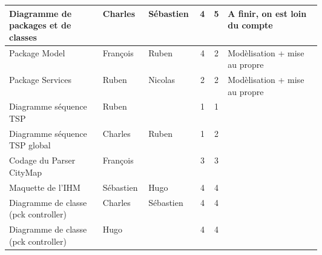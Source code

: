\begin{longtable}{|p{0.3\linewidth}|l|l|c|c|p{0.3\linewidth}|}
Diagramme de packages et de classes         & Charles                                        & Sébastien                                 & 4                             & 5                            & A finir, on est loin du compte                              \\ \hline
Package Model                               & François                                       & Ruben                                     & 4                             & 2                            & Modèlisation + mise au propre                               \\ \hline
Package Services                            & Ruben                                          & Nicolas                                   & 2                             & 2                            & Modèlisation + mise au propre                               \\ \hline
Diagramme séquence TSP                      & Ruben                                          &                                           & 1                             & 1                            &                                                             \\ \hline
Diagramme séquence TSP global               & Charles                                        & Ruben                                     & 1                             & 2                            &                                                             \\ \hline
Codage du Parser CityMap                    & François                                       &                                           & 3                             & 3                            &                                                             \\ \hline
Maquette de l'IHM                           & Sébastien                                      & Hugo                                      & 4                             & 4                            &                                                             \\ \hline
Diagramme de classe (pck controller)        & Charles                                        & Sébastien                                 & 4                             & 4                            &                                                             \\ \hline
Diagramme de classe (pck controller)        & Hugo                                           &                                           & 4                             & 4                            &                                                             \\ \hline

\end{longtable}
